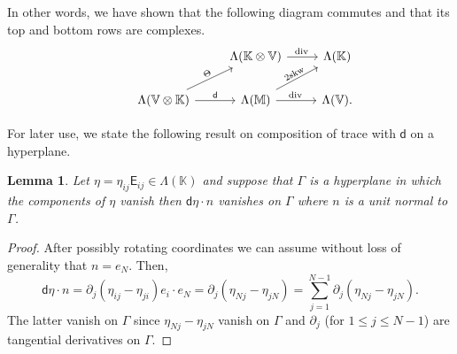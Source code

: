 \documentclass[12pt]{amsart}
\numberwithin{equation}{section}
\newtheorem{lemma}[theorem]{Lemma}
\theoremstyle{definition}
\theoremstyle{remark}
\newtheorem{remark}[theorem]{Remark}
\newcommand{\V}{\mathbb{V}}
\newcommand{\M}{\mathbb{M}}
\newcommand{\K}{\mathbb{K}}
\renewcommand{\(}{\bigl(}
\renewcommand{\)}{\bigr)}
\newcommand{\EK}{\mathsf{E}}
\newcommand{\dd}{\mathsf{d}}
\newcommand{\curl}{{\ensuremath\mathop{\mathrm{curl}\,}}}
\newcommand{\dive}{{\ensuremath\mathop{\mathrm{div}\,}}} %
\newcommand\mskw{\operatorname{mskw}}
\begin{document}
In other words,  we have shown that the following diagram commutes and that its  top and bottom rows are complexes.
\begin{equation*}
      \begin{tikzcd}
        &
        &
        \Lambda(\K \otimes \V)
        \arrow{r}{\dive}
        &  \Lambda(\K) 
        \\
        & \Lambda(\V \otimes \K)
        \arrow{r}{\dd}\arrow[ur, "\Theta", sloped]
        &
        \Lambda(\M)
        \arrow{r}{\dive}\arrow[ur, "2\mathrm{skw}", sloped]
        & \Lambda(\V) .
      \end{tikzcd} 
    \end{equation*}


For later use, we state the following result on composition of  trace with $\dd$ on a hyperplane.
\begin{lemma}\label{traceGamma}
Let $\eta= \eta_{ij} \EK_{ij} \in \Lambda(\K)$ and suppose that $\Gamma$ is a hyperplane in which the components of $\eta$ vanish then $\dd \eta  \cdot n$ vanishes on $\Gamma$ where $n$ is a unit normal to $\Gamma$.   
\end{lemma}
\begin{proof}
After possibly rotating coordinates we can assume without loss of generality that $n=e_N$. Then, 
\begin{equation*}
\dd \eta \cdot n=\partial_j (\eta_{ij}-\eta_{ji}) e_i \cdot e_N= \partial_j (\eta_{Nj}-\eta_{jN})=\sum_{j=1}^{N-1} \partial_j (\eta_{Nj}-\eta_{jN}). 
\end{equation*}
The latter vanish on $\Gamma$ since $\eta_{Nj}-\eta_{jN}$ vanish on $\Gamma$  and $\partial_j$ (for $1 \le j\le N-1$) are tangential derivatives on $\Gamma$. 
\end{proof}
\end{document}

